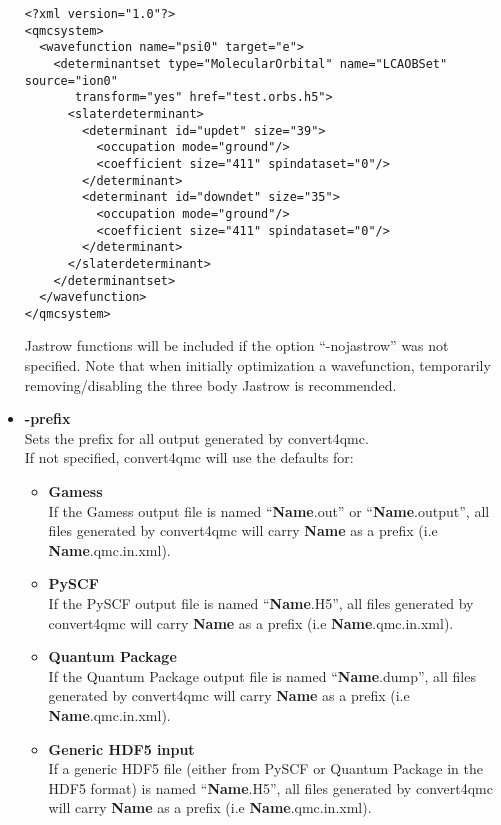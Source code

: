 \begin{itemize}
\begin{lstlisting}[style=QMCPXML]
 <?xml version="1.0"?>
<qmcsystem>
  <wavefunction name="psi0" target="e">
    <determinantset type="MolecularOrbital" name="LCAOBSet" source="ion0"
       transform="yes" href="test.orbs.h5">
      <slaterdeterminant>
        <determinant id="updet" size="39">
          <occupation mode="ground"/>
          <coefficient size="411" spindataset="0"/>
        </determinant>
        <determinant id="downdet" size="35">
          <occupation mode="ground"/>
          <coefficient size="411" spindataset="0"/>
        </determinant>
      </slaterdeterminant>
    </determinantset>
  </wavefunction>
</qmcsystem>
\end{lstlisting}

Jastrow functions will be included if the option ``-nojastrow'' was
not specified. Note that when initially optimization a wavefunction,
temporarily removing/disabling the three body Jastrow is recommended.

\item \textbf{-prefix}\\
Sets the prefix for all output generated by convert4qmc. \\
If not specified, convert4qmc will use the defaults for:\\
\begin{itemize}
 \item \textbf{Gamess}\\
If the Gamess output file  is named ``\textbf{Name}.out'' or ``\textbf{Name}.output'', all files generated by convert4qmc will carry \textbf{Name} as a prefix (i.e \textbf{Name}.qmc.in.xml).\\ 
\item \textbf{PySCF}\\
If the PySCF output file  is named ``\textbf{Name}.H5'', all files generated by convert4qmc will carry \textbf{Name} as a prefix (i.e \textbf{Name}.qmc.in.xml).\\ 
\item \textbf{Quantum Package}\\
If the Quantum Package output file  is named ``\textbf{Name}.dump'', all files generated by convert4qmc will carry \textbf{Name} as a prefix (i.e \textbf{Name}.qmc.in.xml).\\ 
\item \textbf{Generic HDF5 input}\\
If a generic HDF5 file (either from PySCF or Quantum Package in the HDF5 format) is named ``\textbf{Name}.H5'', all files generated by convert4qmc will carry \textbf{Name} as a prefix (i.e \textbf{Name}.qmc.in.xml).\\ 


\end{itemize}
\end{itemize}
